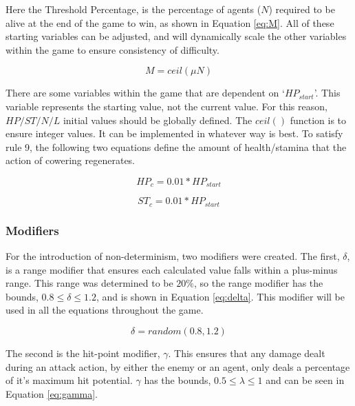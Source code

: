 Here the Threshold Percentage, is the percentage of agents ($N$) required to be alive at the end of the game to win, as shown in Equation \ref{eq:M}. All of these starting variables can be adjusted, and will dynamically scale the other variables within the game to ensure consistency of difficulty. 

\begin{equation}\label{eq:M}
    M = ceil(\mu N)
\end{equation}

There are some variables within the game that are dependent on `$HP_{start}$'. This variable represents the starting value, not the current value. For this reason, $HP/ST/N/L$ initial values should be globally defined. The $ceil()$ function is to ensure integer values. It can be implemented in whatever way is best. To satisfy rule 9, the following two equations define the amount of health/stamina that the action of cowering regenerates.  

\begin{equation}
    HP_c = 0.01*HP_{start}
\end{equation}

\begin{equation}
    ST_c = 0.01*HP_{start}
\end{equation}


\subsubsection{Modifiers}\label{sec: modifiers}


For the introduction of non-determinism, two modifiers were created. The first, $\delta$, is a range modifier that ensures each calculated value falls within a plus-minus range. This range was determined to be $20\%$, so the range modifier has the bounds, $0.8 \leq \delta \leq 1.2 $, and is shown in Equation \ref{eq:delta}. This modifier will be used in all the equations throughout the game. 

\begin{equation}\label{eq:delta}
    \delta = random(0.8,1.2)
\end{equation}

The second is the hit-point modifier, $\gamma$. This ensures that any damage dealt during an attack action, by either the enemy or an agent, only deals a percentage of it's maximum hit potential. $\gamma$ has the bounds, $0.5 \leq \lambda \leq 1$ and can be seen in Equation \ref{eq:gamma}. 

